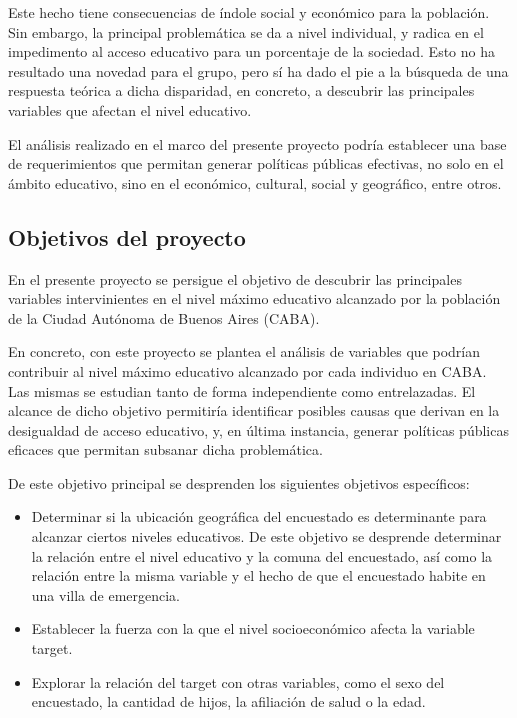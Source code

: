\documentclass[a4paper]{article}
\begin{document}
        Este hecho tiene consecuencias de índole social y económico para la población. Sin embargo, la principal problemática se da a nivel individual, y radica en el impedimento al acceso educativo para un porcentaje de la sociedad. Esto no ha resultado una novedad para el grupo, pero sí ha dado el pie a la búsqueda de una respuesta teórica a dicha disparidad, en concreto, a descubrir las principales variables que afectan el nivel educativo.

        El análisis realizado en el marco del presente proyecto podría establecer una base de requerimientos que permitan generar políticas públicas efectivas, no solo en el ámbito educativo, sino en el económico, cultural, social y geográfico, entre otros.

    \subsection{Objetivos del proyecto}

        En el presente proyecto se persigue el objetivo de descubrir las principales variables intervinientes en el nivel máximo educativo alcanzado por la población de la Ciudad Autónoma de Buenos Aires (CABA).
        
        En concreto, con este proyecto se plantea el análisis de variables que podrían contribuir al nivel máximo educativo alcanzado por cada individuo en CABA. Las mismas se estudian tanto de forma independiente como entrelazadas. El alcance de dicho objetivo permitiría identificar posibles causas que derivan en la desigualdad de acceso educativo, y, en última instancia, generar políticas públicas eficaces que permitan subsanar dicha problemática. 

        De este objetivo principal se desprenden los siguientes objetivos específicos:
        \begin{itemize}
            \item Determinar si la ubicación geográfica del encuestado es determinante para alcanzar ciertos niveles educativos. De este objetivo se desprende determinar la relación entre el nivel educativo y la comuna del encuestado, así como la relación entre la misma variable y el hecho de que el encuestado habite en una villa de emergencia.
            \item Establecer la fuerza con la que el nivel socioeconómico afecta la variable target.
            \item Explorar la relación del target con otras variables, como el sexo del encuestado, la cantidad de hijos, la afiliación de salud o la edad.
        \end{itemize}
\end{document}
